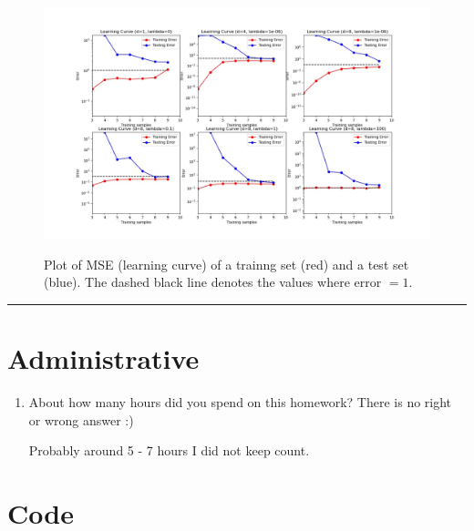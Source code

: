 \documentclass{article}
\begin{document}
\begin{aprob}
    \begin{figure}
        \centering
        \includegraphics[width=\textwidth]{../../../hw1-code/homeworks/poly_regression/fig3.jpg} \label{fig:mse}
        \caption{Plot of MSE (learning curve) of a trainng set (red) and a test set (blue). The dashed black line denotes the values where error $=1$.}
    \end{figure}

\end{aprob}

\rule{\textwidth}{0.25pt}

\newpage
\section*{Administrative}
\begin{aprob}
\begin{enumerate}
    \item {} About how many hours did you spend on this homework? There is no right or wrong answer :)

    Probably around 5 - 7 hours I did not keep count.
\end{enumerate}

\end{aprob}

\newpage
\section*{Code}
\end{document}
